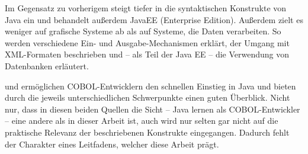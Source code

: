 Im Gegensatz zu vorherigem steigt  tiefer in die syntaktischen Konstrukte von Java ein und behandelt außerdem JavaEE (Enterprise Edition). Außerdem zielt es weniger auf grafische Systeme ab als auf Systeme, die Daten verarbeiten. So werden verschiedene Ein- und Ausgabe-Mechanismen erklärt, der Umgang mit XML-Formaten beschrieben und -- als Teil der Java EE -- die Verwendung von Datenbanken erläutert.

 und  ermöglichen COBOL-Entwicklern den schnellen Einstieg in Java und bieten durch die jeweils unterschiedlichen Schwerpunkte einen guten Überblick. Nicht nur, dass in diesen beiden Quellen die Sicht -- Java lernen als COBOL-Entwickler -- eine andere als in dieser Arbeit ist, auch wird nur selten \bzw gar nicht auf die praktische Relevanz der beschriebenen Konstrukte eingegangen. Dadurch fehlt der Charakter eines Leitfadens, welcher diese Arbeit prägt. 